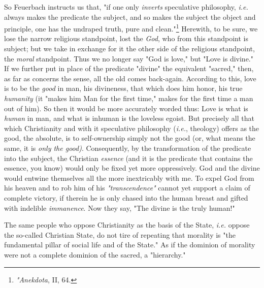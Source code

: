 So Feuerbach instructs us that, "{}if one only \textit{inverts} speculative 
philosophy, \textit{i.e.} always makes the predicate the subject, and so makes 
the subject the object and principle, one has the undraped truth, pure and 
clean."{}\footnote{\textit{"{}Anekdota}, II, 64.} Herewith, to be sure, we 
lose the narrow religious standpoint, lost the \textit{God}, who from this 
standpoint is subject; but we take in exchange for it the other side of the 
religious standpoint, the \textit{moral} standpoint. Thus we no longer say 
"{}God is love,"{} but "{}Love is divine."{} If we further put in place of the 
predicate "{}divine"{} the equivalent "{}sacred,"{} then, as far as concerns 
the sense, all the old comes back-again. According to this, love is to be the 
\textit{good} in man, his divineness, that which does him honor, his true 
\textit{humanity} (it "{}makes him Man for the first time,"{} makes for the 
first time a man out of him). So then it would be more accurately worded thus: 
Love is what is \textit{human} in man, and what is inhuman is the loveless 
egoist. But precisely all that which Christianity and with it speculative 
philosophy (\textit{i.e.}, theology) offers as the good, the absolute, is to 
self-ownership simply not the good (or, what means the same, it is 
\textit{only the good)}. Consequently, by the transformation of the predicate 
into the subject, the Christian \textit{essence} (and it is the predicate that 
contains the essence, you know) would only be fixed yet more oppressively. God 
and the divine would entwine themselves all the more inextricably with me. To 
expel God from his heaven and to rob him of his \textit{"{}transcendence"{}} 
cannot yet support a claim of complete victory, if therein he is only chased 
into the human breast and gifted with indelible \textit{immanence}. Now they 
say, "{}The divine is the truly human!"{}

The same people who oppose Christianity as the basis of the State, 
\textit{i.e.} oppose the so-called Christian State, do not tire of repeating 
that morality is "{}the fundamental pillar of social life and of the State."{} 
As if the dominion of morality were not a complete dominion of the sacred, a 
"{}hierarchy."{}

